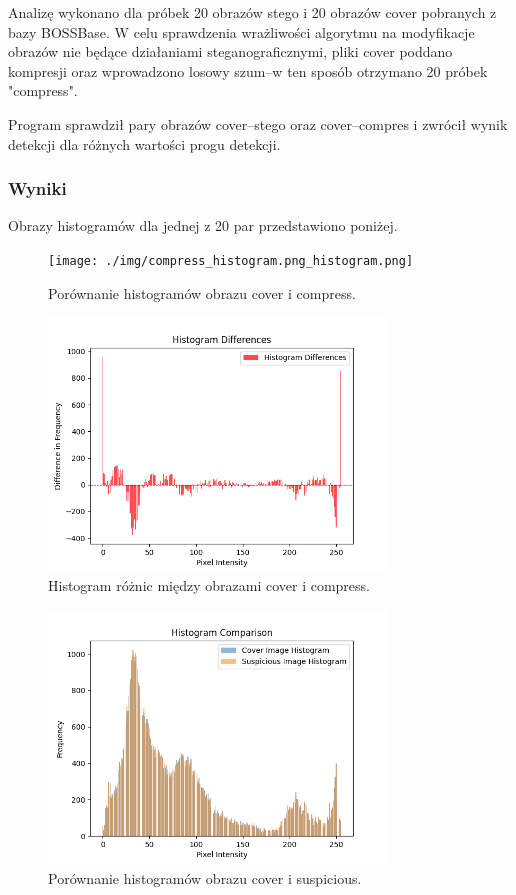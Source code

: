 Analizę wykonano dla próbek 20 obrazów stego i 20 obrazów cover pobranych z bazy BOSSBase. W celu sprawdzenia 
wrażliwości algorytmu na modyfikacje obrazów nie będące działaniami steganograficznymi, pliki cover poddano 
kompresji oraz wprowadzono losowy szum--w ten sposób otrzymano 20 próbek "compress".

Program sprawdził pary obrazów cover--stego oraz cover--compres i zwrócił wynik detekcji dla różnych 
wartości progu detekcji.

\subsubsection{Wyniki}

Obrazy histogramów dla jednej z 20 par przedstawiono poniżej.
\begin{figure}[h!]
    \centering
    \texttt{[image: ./img/compress\_histogram.png\_histogram.png]}
    \caption{Porównanie histogramów obrazu cover i compress.}
    \label{fig:histogram_comparison}
\end{figure}
   
\begin{figure}[h!]
    \centering
    \includegraphics[width=0.8\textwidth]{./img/compress_diff_histogram.png}
    \caption{Histogram różnic między obrazami cover i compress.}
    \label{fig:histogram_diff}

\end{figure}\begin{figure}[h!]
    \centering
    \includegraphics[width=0.8\textwidth]{./img/cover_histogram.png}
    \caption{Porównanie histogramów obrazu cover i suspicious.}
    \label{fig:histogram_comparison}
\end{figure}
   

